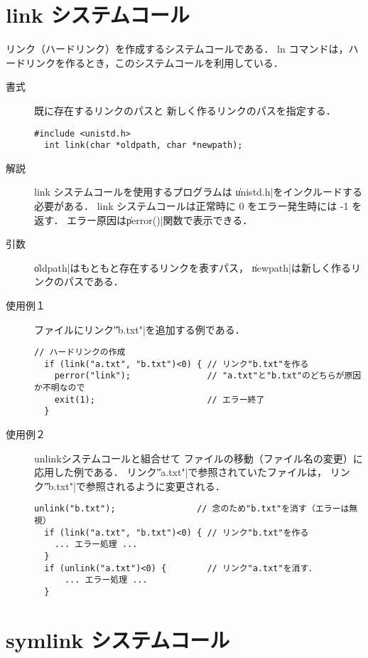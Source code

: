 \section{link システムコール}
リンク（ハードリンク）を作成するシステムコールである．
ln コマンドは，ハードリンクを作るとき，このシステムコールを利用している．

\begin{description}
\item[書式] 既に存在するリンクのパスと
新しく作るリンクのパスを指定する．
\begin{lstlisting}[numbers=none]
  #include <unistd.h>
  int link(char *oldpath, char *newpath);
\end{lstlisting}

\item[解説] link システムコールを使用するプログラムは
\|unistd.h|をインクルードする必要がある．
link システムコールは正常時に 0 をエラー発生時には -1 を返す．
エラー原因は\|perror()|関数で表示できる．

\item[引数] \|oldpath|はもともと存在するリンクを表すパス，
  \|newpath|は新しく作るリンクのパスである．

\item[使用例１] ファイルにリンク\|"b.txt"|を追加する例である．
\begin{lstlisting}[numbers=none]
  // ハードリンクの作成
  if (link("a.txt", "b.txt")<0) { // リンク"b.txt"を作る
    perror("link");               // "a.txt"と"b.txt"のどちらが原因か不明なので
    exit(1);                      // エラー終了
  }
\end{lstlisting}

\item[使用例２]unlinkシステムコールと組合せて
ファイルの移動（ファイル名の変更）に応用した例である．
リンク\|"a.txt"|で参照されていたファイルは，
リンク\|"b.txt"|で参照されるように変更される．
\begin{lstlisting}[numbers=none]
  unlink("b.txt");                // 念のため"b.txt"を消す（エラーは無視）
  if (link("a.txt", "b.txt")<0) { // リンク"b.txt"を作る
    ... エラー処理 ... 
  }
  if (unlink("a.txt")<0) {        // リンク"a.txt"を消す．
      ... エラー処理 ... 
  }
\end{lstlisting}
\end{description}

\section{symlink システムコール}

